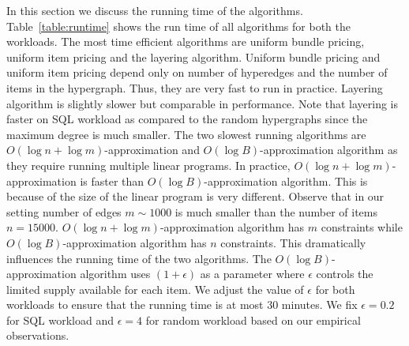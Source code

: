 In this section we discuss the running time of the algorithms. Table~\ref{table:runtime} shows the run time of all algorithms for both the workloads. The most time efficient algorithms are uniform bundle pricing, uniform item pricing and the layering algorithm. Uniform bundle pricing and uniform item pricing depend only on number of hyperedges and the number of items in the hypergraph. Thus, they are very fast to run in practice. Layering algorithm is slightly slower but comparable in performance. Note that layering is faster on SQL workload as compared to the random hypergraphs since the maximum degree is much smaller. The two slowest running algorithms are $O(\log n + \log m)$-approximation and $O(\log B)$-approximation algorithm as they require running multiple linear programs. In practice, $O(\log n + \log m)$-approximation is faster than $O(\log B)$-approximation algorithm. This is because of the size of the linear program is very different. Observe that in our setting number of edges $m \sim 1000$ is much smaller than the number of items $n = 15000$. $O(\log n + \log m)$-approximation algorithm has $m$ constraints while $O(\log B)$-approximation algorithm has $n$ constraints. This dramatically influences the running time of the two algorithms. The $O(\log B)$-approximation algorithm uses $(1+\epsilon)$ as a parameter where $\epsilon$ controls the limited supply available for each item. We adjust the value of $\epsilon$ for both workloads to ensure that the running time is at most $30$ minutes. We fix $\epsilon = 0.2$ for SQL workload and $\epsilon = 4$ for random workload based on our empirical observations.
